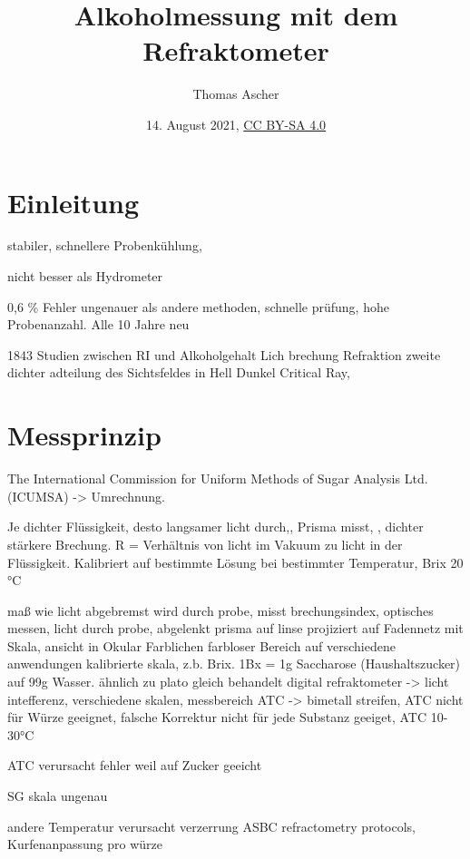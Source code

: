 \documentclass[a4paper,parskip=half]{scrartcl}
\title{Alkoholmessung mit dem Refraktometer}
\author{Thomas Ascher}
\date{14. August 2021, \href{http://creativecommons.org/licenses/by-sa/4.0/}{CC BY-SA 4.0}}
\begin{document}
\maketitle

\section*{Einleitung}

stabiler, schnellere Probenkühlung,
\autocite{Terrill2013}

nicht besser als Hydrometer
\autocite{Terrill2011}


0,6 \% Fehler ungenauer als andere methoden, schnelle prüfung,
hohe Probenanzahl. Alle 10 Jahre neu
\autocite{Bettner1969}

1843 Studien zwischen RI und Alkoholgehalt
Lich brechung Refraktion
zweite dichter adteilung des Sichtsfeldes in Hell Dunkel Critical Ray,

\autocite{Gamer1959}

\section*{Messprinzip}

The International Commission for Uniform Methods of Sugar Analysis  Ltd. (ICUMSA) -> Umrechnung.

Je dichter Flüssigkeit, desto langsamer licht durch,, Prisma misst, , dichter stärkere Brechung.  R = Verhältnis von licht im
Vakuum zu licht in der Flüssigkeit.
Kalibriert auf bestimmte Lösung bei bestimmter Temperatur,
Brix 20 °C
\autocite{Bonham2001}


maß wie licht abgebremst wird durch probe,
misst brechungsindex, optisches messen, licht durch probe, abgelenkt
prisma auf linse projiziert auf Fadennetz mit Skala, ansicht in Okular
Farblichen farbloser Bereich
auf verschiedene anwendungen kalibrierte skala, z.b. Brix.
1Bx = 1g Saccharose (Haushaltszucker) auf 99g Wasser. ähnlich zu plato
gleich behandelt
digital refraktometer -> licht intefferenz, verschiedene skalen, messbereich
ATC -> bimetall streifen, ATC nicht für Würze geeignet, falsche Korrektur
nicht für jede Substanz geeiget, ATC 10-30°C
\autocite{Terrill2013}

ATC verursacht fehler weil auf Zucker geeicht
\autocite{Terrill2010}

SG skala ungenau
\autocite{Terrill2011}

andere Temperatur verursacht verzerrung
ASBC refractometry protocols, Kurfenanpassung pro würze
\autocite{Bonham2001}
\end{document}
